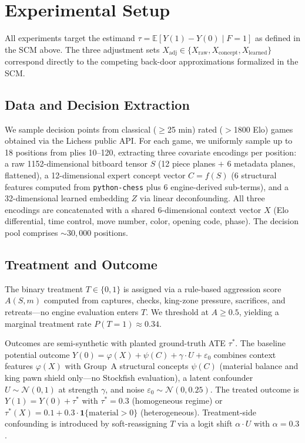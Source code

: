 \documentclass{article}
\begin{document}
\section{Experimental Setup}

All experiments target the estimand $\tau = \mathbb{E}[Y(1) - Y(0) \mid F=1]$ as
defined in the SCM above. The three adjustment sets
$X_{\text{adj}} \in \{X_{\text{raw}}, X_{\text{concept}}, X_{\text{learned}}\}$
correspond directly to the competing back-door approximations formalized in the SCM.

\subsection{Data and Decision Extraction}
We sample decision points from classical ($\geq$25 min) rated ($>$1800 Elo) games
obtained via the Lichess public API. For each game, we uniformly sample up to 18
positions from plies 10--120, extracting three covariate encodings per position: a
raw 1152-dimensional bitboard tensor $S$ (12 piece planes $+$ 6 metadata planes,
flattened), a 12-dimensional expert concept vector $C = f(S)$ (6 structural features
computed from \texttt{python-chess} plus 6 engine-derived sub-terms), and a
32-dimensional learned embedding $Z$ via linear deconfounding.\cite{kuang2020information}
All three encodings are concatenated with a shared 6-dimensional context vector $X$
(Elo differential, time control, move number, color, opening code, phase). The
decision pool comprises ${\sim}30{,}000$ positions.

\subsection{Treatment and Outcome}
The binary treatment $T \in \{0,1\}$ is assigned via a rule-based aggression score
$A(S,m)$ computed from captures, checks, king-zone pressure, sacrifices, and
retreats---no engine evaluation enters $T$. We threshold at $A \geq 0.5$, yielding
a marginal treatment rate $P(T{=}1) \approx 0.34$.

Outcomes are semi-synthetic with planted ground-truth ATE $\tau^*$. The baseline
potential outcome $Y(0) = \varphi(X) + \psi(C) + \gamma \cdot U + \varepsilon_0$
combines context features $\varphi(X)$ with Group~A structural concepts $\psi(C)$
(material balance and king pawn shield only---no Stockfish evaluation), a latent
confounder $U \sim \mathcal{N}(0,1)$ at strength $\gamma$, and noise $\varepsilon_0
\sim \mathcal{N}(0, 0.25)$. The treated outcome is $Y(1) = Y(0) + \tau^*$ with
$\tau^* = 0.3$ (homogeneous regime) or $\tau^*(X) = 0.1 + 0.3 \cdot
\mathbf{1}\{\text{material} > 0\}$ (heterogeneous). Treatment-side confounding is
introduced by soft-reassigning $T$ via a logit shift $\alpha \cdot U$ with $\alpha
= 0.3$.
\end{document}
